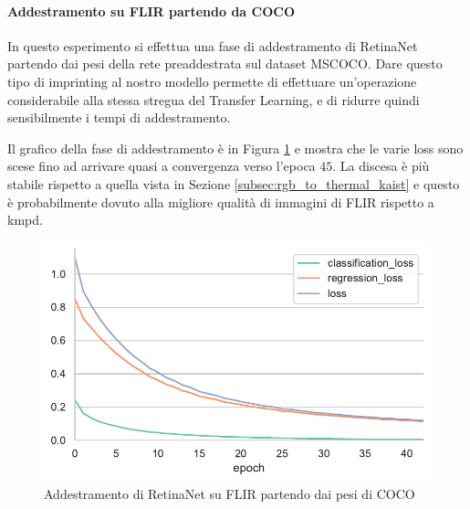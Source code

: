 \paragraph{Addestramento su FLIR partendo da COCO}
In questo esperimento si effettua una fase di addestramento di RetinaNet partendo dai pesi della rete preaddestrata sul dataset \ac{MSCOCO}. Dare questo tipo di imprinting al nostro modello permette di effettuare un'operazione considerabile alla stessa stregua del Transfer Learning, e di ridurre quindi sensibilmente i tempi di addestramento. 

Il grafico della fase di addestramento è in Figura \ref{fig:train_from_coco_FLIR} e mostra che le varie loss sono scese fino ad arrivare quasi a convergenza verso l'epoca $45$. La discesa è più stabile rispetto a quella vista in Sezione \ref{subsec:rgb_to_thermal_kaist} e questo è probabilmente dovuto alla migliore qualità di immagini di FLIR rispetto a \ac{kmpd}.  
\begin{figure}[]
    \centering
    \includegraphics[width = \textwidth]{images/graphic/train_flir_from_coco.pdf}
    \caption{Addestramento di RetinaNet su FLIR partendo dai pesi di COCO}
    \label{fig:train_from_coco_FLIR}
\end{figure}

